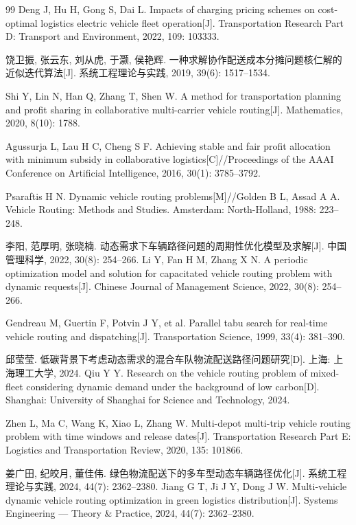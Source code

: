 \documentclass{setp-new}
\begin{document}
\begin{thebibliography}{99}
 Deng J, Hu H, Gong S, Dai L. Impacts of charging pricing schemes on cost-optimal logistics electric vehicle fleet operation[J]. Transportation Research Part D: Transport and Environment, 2022, 109: 103333.

 饶卫振, 张云东, 刘从虎, 于灏, 侯艳辉. 一种求解协作配送成本分摊问题核仁解的近似迭代算法[J]. 系统工程理论与实践, 2019, 39(6): 1517--1534.

 Shi Y, Lin N, Han Q, Zhang T, Shen W. A method for transportation planning and profit sharing in collaborative multi-carrier vehicle routing[J]. Mathematics, 2020, 8(10): 1788.

 Agussurja L, Lau H C, Cheng S F. Achieving stable and fair profit allocation with minimum subsidy in collaborative logistics[C]//Proceedings of the AAAI Conference on Artificial Intelligence, 2016, 30(1): 3785--3792.

 Psaraftis H N. Dynamic vehicle routing problems[M]//Golden B L, Assad A A. Vehicle Routing: Methods and Studies. Amsterdam: North-Holland, 1988: 223--248.

 李阳, 范厚明, 张晓楠. 动态需求下车辆路径问题的周期性优化模型及求解[J]. 中国管理科学, 2022, 30(8): 254--266.\newline
Li Y, Fan H M, Zhang X N. A periodic optimization model and solution for capacitated vehicle routing problem with dynamic requests[J]. Chinese Journal of Management Science, 2022, 30(8): 254--266.

 Gendreau M, Guertin F, Potvin J Y, et al. Parallel tabu search for real-time vehicle routing and dispatching[J]. Transportation Science, 1999, 33(4): 381--390.

 邱莹莹. 低碳背景下考虑动态需求的混合车队物流配送路径问题研究[D]. 上海: 上海理工大学, 2024.\newline
Qiu Y Y. Research on the vehicle routing problem of mixed-fleet considering dynamic demand under the background of low carbon[D]. Shanghai: University of Shanghai for Science and Technology, 2024.

 Zhen L, Ma C, Wang K, Xiao L, Zhang W. Multi-depot multi-trip vehicle routing problem with time windows and release dates[J]. Transportation Research Part E: Logistics and Transportation Review, 2020, 135: 101866.

 姜广田, 纪皎月, 董佳伟. 绿色物流配送下的多车型动态车辆路径优化[J]. 系统工程理论与实践, 2024, 44(7): 2362--2380.\newline
Jiang G T, Ji J Y, Dong J W. Multi-vehicle dynamic vehicle routing optimization in green logistics distribution[J]. Systems Engineering --- Theory \& Practice, 2024, 44(7): 2362--2380.


\end{thebibliography}
\end{document}
